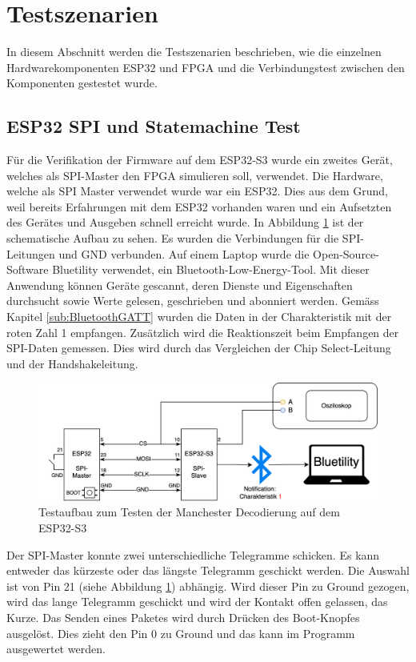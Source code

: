 \section{Testszenarien} %
In diesem Abschnitt werden die Testszenarien beschrieben, wie die einzelnen Hardwarekomponenten ESP32 und FPGA und die Verbindungstest zwischen den Komponenten gestestet wurde.

\subsection{ESP32 SPI und Statemachine Test}
\label{sub:ESPSPIundFSMTest}

Für die Verifikation der Firmware auf dem ESP32-S3 wurde ein zweites Gerät, welches als SPI-Master den FPGA simulieren soll, verwendet. Die Hardware, welche als SPI Master verwendet wurde war ein ESP32. Dies aus dem Grund, weil bereits Erfahrungen mit dem ESP32 vorhanden waren und ein Aufsetzten des Gerätes und Ausgeben schnell erreicht wurde. In Abbildung \ref{fig:TestszenarioESP32} ist der schematische Aufbau zu sehen. Es wurden die Verbindungen für die SPI-Leitungen und GND verbunden. Auf einem Laptop wurde die Open-Source-Software Bluetility verwendet, ein Bluetooth-Low-Energy-Tool. Mit dieser Anwendung können Geräte gescannt, deren Dienste und Eigenschaften durchsucht sowie Werte gelesen, geschrieben und abonniert werden. Gemäss Kapitel \ref{sub:BluetoothGATT} wurden die Daten in der Charakteristik mit der roten Zahl 1 empfangen. Zusätzlich wird die Reaktionszeit beim Empfangen der SPI-Daten gemessen. Dies wird durch das Vergleichen der Chip Select-Leitung und der Handshakeleitung. 

\begin{figure}[H]
    \centering
    \includegraphics[width=0.9\linewidth]{Figures/Chap3/Testszenarien/Testszenario_ESP32.png}
    \caption{Testaufbau zum Testen der Manchester Decodierung auf dem ESP32-S3}
    \label{fig:TestszenarioESP32}
\end{figure}

Der SPI-Master konnte zwei unterschiedliche Telegramme schicken. Es kann entweder das kürzeste oder das längste Telegramm geschickt werden. Die Auswahl ist von Pin 21 (siehe Abbildung \ref{fig:TestszenarioESP32}) abhängig. Wird dieser Pin zu Ground gezogen, wird das lange Telegramm geschickt und wird der Kontakt offen gelassen, das Kurze. Das Senden eines Paketes wird durch Drücken des Boot-Knopfes ausgelöst. Dies zieht den Pin 0 zu Ground und das kann im Programm ausgewertet werden. 

